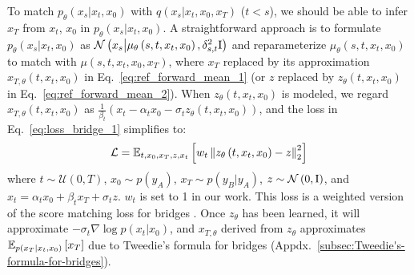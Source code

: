 To match $p_{\theta}\left(x_{s}|x_{t},x_{0}\right)$ with $q\left(x_{s}|x_{t},x_{0},x_{T}\right)$
($t<s$), we should be able to infer $x_{T}$ from $x_{t}$, $x_{0}$
in $p_{\theta}\left(x_{s}|x_{t},x_{0}\right)$. A straightforward
approach is to formulate $p_{\theta}\left(x_{s}|x_{t},x_{0}\right)$
as $\mathcal{N}\left(x_{s}\big|\mu_{\theta}\left(s,t,x_{t},x_{0}\right),\delta_{s,t}^{2}\mathrm{I}\right)$
and reparameterize $\mu_{\theta}\left(s,t,x_{t},x_{0}\right)$ to
match with $\mu\left(s,t,x_{t},x_{0},x_{T}\right)$, where $x_{T}$
replaced by its approximation $x_{T,\theta}\left(t,x_{t},x_{0}\right)$
in Eq.~\ref{eq:ref_forward_mean_1} (or $z$ replaced by $z_{\theta}\left(t,x_{t},x_{0}\right)$
in Eq.~\ref{eq:ref_forward_mean_2}). When $z_{\theta}\left(t,x_{t},x_{0}\right)$
is modeled, we regard $x_{T,\theta}\left(t,x_{t},x_{0}\right)$ as
$\frac{1}{\beta_{t}}\left(x_{t}-\alpha_{t}x_{0}-\sigma_{t}z_{\theta}\left(t,x_{t},x_{0}\right)\right)$,
and the loss in Eq.~\ref{eq:loss_bridge_1} simplifies to:
\begin{equation}
\mathcal{L}=\mathbb{E}_{t,x_{0},x_{T},z,x_{t}}\left[w_{t}\left\Vert z_{\theta}\left(t,x_{t},x_{0}\right)-z\right\Vert _{2}^{2}\right]\label{eq:loss_bridge_2}
\end{equation}
where $t\sim\mathcal{U}\left(0,T\right)$, $x_{0}\sim p\left(y_{A}\right)$,
$x_{T}\sim p\left(y_{B}|y_{A}\right)$, $z\sim\mathcal{N}\left(0,\mathrm{I}\right)$,
and $x_{t}=\alpha_{t}x_{0}+\beta_{t}x_{T}+\sigma_{t}z$. $w_{t}$
is set to 1 in our work. This loss is a weighted version of the score
matching loss for bridges \cite{zhou2024denoising}. Once $z_{\theta}$
has been learned, it will approximate $-\sigma_{t}\nabla\log p\left(x_{t}|x_{0}\right)$,
and $x_{T,\theta}$ derived from $z_{\theta}$ approximates $\mathbb{E}_{p\left(x_{T}|x_{t},x_{0}\right)}\left[x_{T}\right]$
due to Tweedie's formula for bridges (Appdx\@.~\ref{subsec:Tweedie's-formula-for-bridges}).

